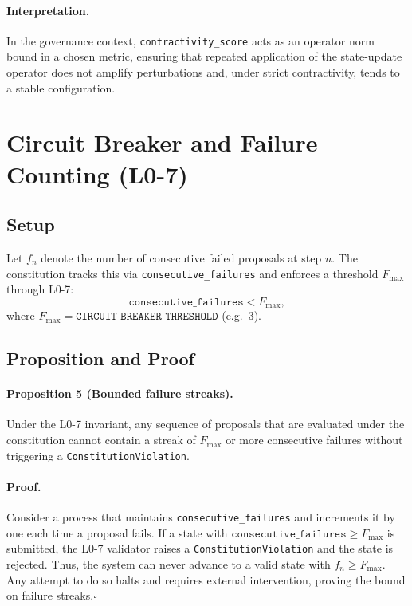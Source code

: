 \documentclass[11pt]{article}
\begin{document}
\paragraph{Interpretation.}
In the governance context, \texttt{contractivity\_score} acts as an operator norm bound in a chosen metric, ensuring that repeated application of the state-update operator does not amplify perturbations and, under strict contractivity, tends to a stable configuration.

\section{Circuit Breaker and Failure Counting (L0-7)}

\subsection{Setup}

Let \(f_n\) denote the number of consecutive failed proposals at step \(n\). The constitution tracks this via \texttt{consecutive\_failures} and enforces a threshold \(F_{\max}\) through L0-7:\cite{cite:40,cite:42}
\[
  \texttt{consecutive\_failures} < F_{\max},
\]
where \(F_{\max} = \texttt{CIRCUIT\_BREAKER\_THRESHOLD}\) (e.g.\ 3).

\subsection{Proposition and Proof}

\paragraph{Proposition 5 (Bounded failure streaks).}
Under the L0-7 invariant, any sequence of proposals that are evaluated under the constitution cannot contain a streak of \(F_{\max}\) or more consecutive failures without triggering a \texttt{ConstitutionViolation}.

\paragraph{Proof.}
Consider a process that maintains \texttt{consecutive\_failures} and increments it by one each time a proposal fails. If a state with \(\texttt{consecutive\_failures} \ge F_{\max}\) is submitted, the L0-7 validator raises a \texttt{ConstitutionViolation} and the state is rejected.\cite{cite:40,cite:42}
Thus, the system can never advance to a valid state with \(f_n \ge F_{\max}\). Any attempt to do so halts and requires external intervention, proving the bound on failure streaks.\(\square\)
\end{document}
